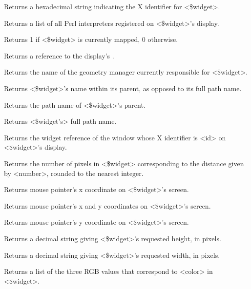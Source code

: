 \begin{enum}{1cm}
Returns  a hexadecimal string indicating the X  identifier for <\$widget>.

Returns a list of all Perl interpreters registered on <\$widget>'s display.

Returns 1 if <\$widget> is currently mapped, 0 otherwise.

Returns a reference to the display's .

Returns the name of the geometry manager currently responsible for
<\$widget>.

Returns <\$widget>'s name within its parent, as opposed to its full path
name.

Returns the path name of <\$widget>'s parent.

Returns <\$widget's> full path name.

Returns the widget reference of the window whose X identifier is <id> on
<\$widget>'s display.

Returns the number of pixels in <\$widget> corresponding to the distance
given by <number>, rounded to the nearest integer.

Returns mouse pointer's x coordinate on <\$widget>'s screen.

Returns mouse pointer's x and y coordinates on <\$widget>'s screen.

Returns mouse pointer's y coordinate on <\$widget>'s screen.

Returns a decimal string giving <\$widget>'s requested height, in pixels.

Returns a decimal string giving <\$widget>'s requested width, in pixels.

Returns a list of the three RGB values that correspond to <color> in <\$widget>.


\end{enum}
